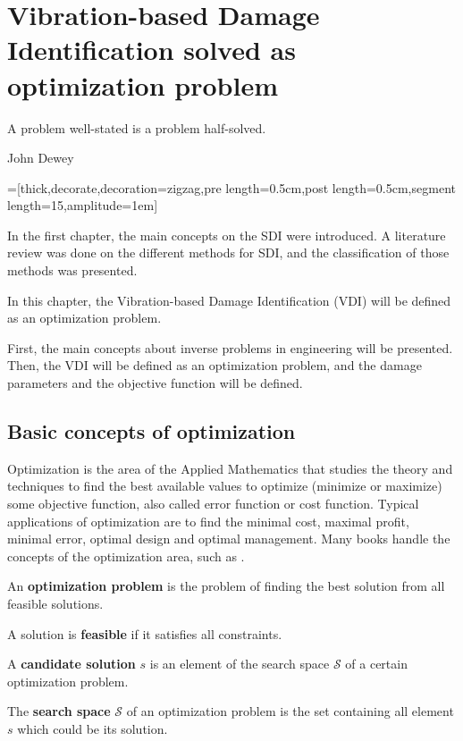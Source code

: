 \chapter{Vibration-based Damage Identification solved as optimization problem}
\label{chp:3}
\epigraph{A problem well-stated is a problem half-solved.}{John Dewey}

=[thick,decorate,decoration={zigzag,pre length=0.5cm,post length=0.5cm,segment length=15,amplitude=1em}]

In the first chapter, the main concepts on the SDI were introduced. A literature review was done on the different methods for SDI, and the classification of those methods was presented.

In this chapter, the Vibration-based Damage Identification (VDI) will be defined as an optimization problem.

First, the main concepts about inverse problems in engineering will be presented. Then, the VDI will be defined as an optimization problem, and the damage parameters and the objective function will be defined.

\section{Basic concepts of optimization}

Optimization is the area of the Applied Mathematics that studies the theory and techniques to find the best available values to optimize (minimize or maximize) some objective function, also called error function or cost function. Typical applications of optimization are to find the minimal cost, maximal profit, minimal error, optimal design and optimal management. Many books handle the concepts of the optimization area, such as .

\begin{definition} 
An \textbf{optimization problem} is the problem of finding the best solution from all feasible solutions. 
\end{definition}

A solution is \textbf{feasible} if it satisfies all constraints.

\begin{definition}
A \textbf{candidate solution} $s$ is an element of the search space $\mathcal{S}$ of a certain optimization problem.
\end{definition}

\begin{definition}
The \textbf{search space} $\mathcal{S}$ of an optimization problem is the set containing all element $s$ which could be its solution.
\end{definition}

